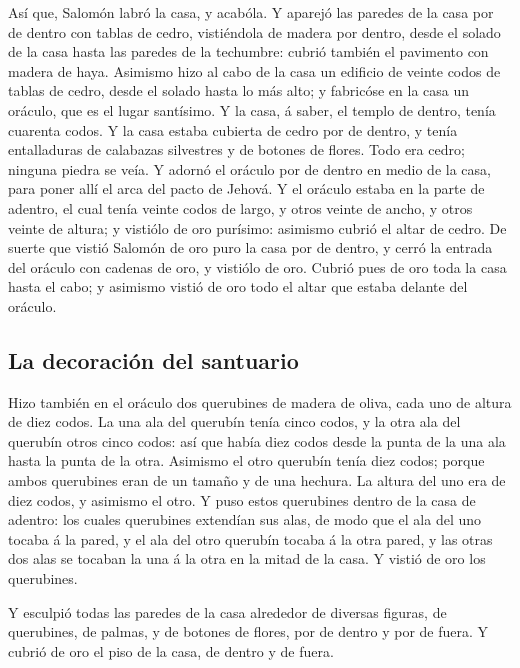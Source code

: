  Así que, Salomón labró la casa, y acabóla.
 Y aparejó las paredes de la casa por de dentro con
tablas de cedro, vistiéndola de madera por dentro, desde el solado de la
casa hasta las paredes de la techumbre: cubrió también el pavimento con
madera de haya.  Asimismo hizo al cabo de la casa un
edificio de veinte codos de tablas de cedro, desde el solado hasta lo
más alto; y fabricóse en la casa un oráculo, que es el lugar santísimo.
 Y la casa, á saber, el templo de dentro, tenía cuarenta
codos.  Y la casa estaba cubierta de cedro por de dentro,
y tenía entalladuras de calabazas silvestres y de botones de flores.
Todo era cedro; ninguna piedra se veía.  Y adornó el
oráculo por de dentro en medio de la casa, para poner allí el arca del
pacto de Jehová.  Y el oráculo estaba en la parte de
adentro, el cual tenía veinte codos de largo, y otros veinte de ancho, y
otros veinte de altura; y vistiólo de oro purísimo: asimismo cubrió el
altar de cedro.  De suerte que vistió Salomón de oro puro
la casa por de dentro, y cerró la entrada del oráculo con cadenas de
oro, y vistiólo de oro.  Cubrió pues de oro toda la casa
hasta el cabo; y asimismo vistió de oro todo el altar que estaba delante
del oráculo.

\hypertarget{la-decoraciuxf3n-del-santuario}{%
\subsection{La decoración del
santuario}\label{la-decoraciuxf3n-del-santuario}}

 Hizo también en el oráculo dos querubines de madera de
oliva, cada uno de altura de diez codos.  La una ala del
querubín tenía cinco codos, y la otra ala del querubín otros cinco
codos: así que había diez codos desde la punta de la una ala hasta la
punta de la otra.  Asimismo el otro querubín tenía diez
codos; porque ambos querubines eran de un tamaño y de una hechura.
 La altura del uno era de diez codos, y asimismo el otro.
 Y puso estos querubines dentro de la casa de adentro:
los cuales querubines extendían sus alas, de modo que el ala del uno
tocaba á la pared, y el ala del otro querubín tocaba á la otra pared, y
las otras dos alas se tocaban la una á la otra en la mitad de la casa.
 Y vistió de oro los querubines.

 Y esculpió todas las paredes de la casa alrededor de
diversas figuras, de querubines, de palmas, y de botones de flores, por
de dentro y por de fuera.  Y cubrió de oro el piso de la
casa, de dentro y de fuera.

